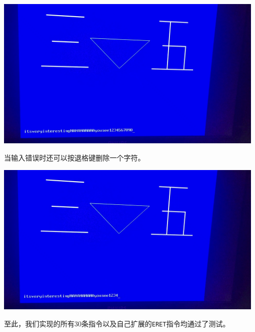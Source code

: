 \begin{center}
    \includegraphics[width=13cm]{image/testing/case}
\end{center}

当输入错误时还可以按退格键删除一个字符。

\begin{center}
    \includegraphics[width=13cm]{image/testing/backspace}
\end{center}

至此，我们实现的所有30条指令以及自己扩展的\texttt{ERET}指令均通过了测试。

